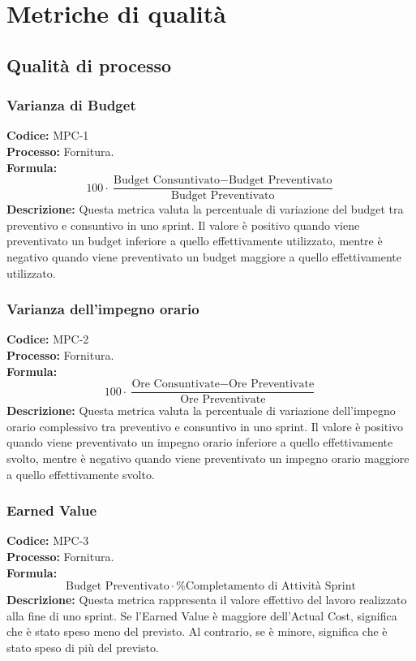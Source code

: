 
\section{Metriche di qualità}
\label{sec:metriche di qualità}

\subsection{Qualità di processo}
\label{sec:Qualità di processo}

\subsubsection{Varianza di Budget}
\textbf{Codice:} MPC-1 \\
\textbf{Processo:} Fornitura. \\
\textbf{Formula:}
\[
100 \cdot \frac{\text{Budget Consuntivato} - \text{Budget Preventivato}}{\text{Budget Preventivato}}
\]
\textbf{Descrizione:} Questa metrica valuta la percentuale di variazione del budget tra preventivo e consuntivo in uno sprint. Il valore è positivo quando viene preventivato un budget inferiore a quello effettivamente utilizzato, mentre è negativo quando viene preventivato un budget maggiore a quello effettivamente utilizzato.

\subsubsection{Varianza dell’impegno orario}
\textbf{Codice:} MPC-2 \\
\textbf{Processo:} Fornitura. \\
\textbf{Formula:}
\[
100 \cdot \frac{\text{Ore Consuntivate} - \text{Ore Preventivate}}{\text{Ore Preventivate}}
\]
\textbf{Descrizione:} Questa metrica valuta la percentuale di variazione dell’impegno orario complessivo tra preventivo e consuntivo in uno sprint. Il valore è positivo quando viene preventivato un impegno orario inferiore a quello effettivamente svolto, mentre è negativo quando viene preventivato un impegno orario maggiore a quello effettivamente svolto.

\subsubsection{Earned Value}
\textbf{Codice:} MPC-3 \\
\textbf{Processo:} Fornitura. \\
\textbf{Formula:}
\[
\text{Budget Preventivato} \cdot \% \text{Completamento di Attività Sprint}
\]
\textbf{Descrizione:} Questa metrica rappresenta il valore effettivo del lavoro realizzato alla fine di uno sprint. Se l’Earned Value è maggiore dell’Actual Cost, significa che è stato speso meno del previsto. Al contrario, se è minore, significa che è stato speso di più del previsto.

